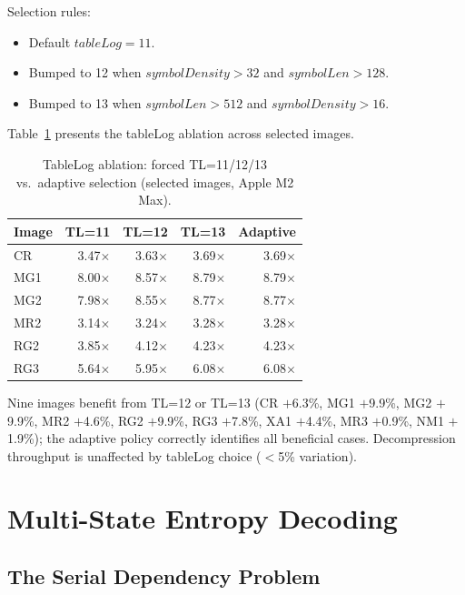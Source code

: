 \documentclass[journal]{IEEEtran}
\begin{document}
Selection rules:
\begin{itemize}
  \item Default $\textit{tableLog} = 11$.
  \item Bumped to 12 when $\textit{symbolDensity} > 32$ and
  $\textit{symbolLen} > 128$.
  \item Bumped to 13 when $\textit{symbolLen} > 512$ and
  $\textit{symbolDensity} > 16$.
\end{itemize}

Table~\ref{tab:tablelog-ablation} presents the tableLog ablation across
selected images.

\begin{table}[htbp]
\centering
\caption{TableLog ablation: forced TL=11/12/13 vs.\ adaptive selection
(selected images, Apple M2 Max).}
\label{tab:tablelog-ablation}
\scriptsize
\begin{tabular}{lrrrr}
\toprule
Image & TL=11 & TL=12 & TL=13 & Adaptive \\
\midrule
CR  & 3.47$\times$ & 3.63$\times$ & 3.69$\times$ & 3.69$\times$ \\
MG1 & 8.00$\times$ & 8.57$\times$ & 8.79$\times$ & 8.79$\times$ \\
MG2 & 7.98$\times$ & 8.55$\times$ & 8.77$\times$ & 8.77$\times$ \\
MR2 & 3.14$\times$ & 3.24$\times$ & 3.28$\times$ & 3.28$\times$ \\
RG2 & 3.85$\times$ & 4.12$\times$ & 4.23$\times$ & 4.23$\times$ \\
RG3 & 5.64$\times$ & 5.95$\times$ & 6.08$\times$ & 6.08$\times$ \\
\bottomrule
\end{tabular}
\end{table}

Nine images benefit from TL=12 or TL=13 (CR $+$6.3\%, MG1 $+$9.9\%, MG2
$+$9.9\%, MR2 $+$4.6\%, RG2 $+$9.9\%, RG3 $+$7.8\%, XA1 $+$4.4\%, MR3
$+$0.9\%, NM1 $+$1.9\%); the adaptive policy correctly identifies all
beneficial cases. Decompression throughput is unaffected by tableLog choice
($<$5\% variation).


\section{Multi-State Entropy Decoding}
\label{sec:multistate}

\subsection{The Serial Dependency Problem}
\end{document}
